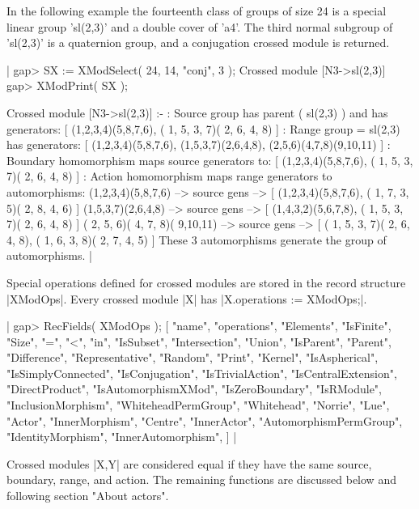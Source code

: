 In the following example the fourteenth class of  groups of size 24 is
a  special linear  group 'sl(2,3)'  and a  double cover  of 'a4'.  The
third normal  subgroup   of 'sl(2,3)' is a    quaternion group, and  a
conjugation crossed module is returned.

|    gap> SX := XModSelect( 24, 14, "conj", 3 );
    Crossed module [N3->sl(2,3)] 
    gap> XModPrint( SX );

    Crossed module [N3->sl(2,3)] :- 
    : Source group has parent ( sl(2,3) )  and has generators:
      [ (1,2,3,4)(5,8,7,6), ( 1, 5, 3, 7)( 2, 6, 4, 8) ]
    : Range group = sl(2,3)  has generators:
      [ (1,2,3,4)(5,8,7,6), (1,5,3,7)(2,6,4,8), (2,5,6)(4,7,8)(9,10,11) ]
    : Boundary homomorphism maps source generators to:
      [ (1,2,3,4)(5,8,7,6), ( 1, 5, 3, 7)( 2, 6, 4, 8) ]
    : Action homomorphism maps range generators to automorphisms:
      (1,2,3,4)(5,8,7,6) --> { source gens --> 
    [ (1,2,3,4)(5,8,7,6), ( 1, 7, 3, 5)( 2, 8, 4, 6) ] }
      (1,5,3,7)(2,6,4,8) --> { source gens -->  
    [ (1,4,3,2)(5,6,7,8), ( 1, 5, 3, 7)( 2, 6, 4, 8) ] }
      ( 2, 5, 6)( 4, 7, 8)( 9,10,11) --> { source gens --> 
    [ ( 1, 5, 3, 7)( 2, 6, 4, 8), ( 1, 6, 3, 8)( 2, 7, 4, 5) ] }
      These 3 automorphisms generate the group of automorphisms. |

%

Special  operations  defined for crossed    modules are stored  in the
record   structure    |XModOps|.  Every    crossed   module  |X|   has
|X.operations := XModOps;|.

|    gap> RecFields( XModOps );
    [ "name", "operations", "Elements", "IsFinite", "Size", "=", "<", 
      "in", "IsSubset", "Intersection", "Union", "IsParent", "Parent", 
      "Difference", "Representative", "Random", "Print", "Kernel", 
      "IsAspherical", "IsSimplyConnected", "IsConjugation", 
      "IsTrivialAction", "IsCentralExtension", "DirectProduct", 
      "IsAutomorphismXMod", "IsZeroBoundary", "IsRModule",
      "InclusionMorphism", "WhiteheadPermGroup", "Whitehead", "Norrie",
      "Lue", "Actor", "InnerMorphism", "Centre", "InnerActor",
       "AutomorphismPermGroup", "IdentityMorphism", "InnerAutomorphism", ] |

Crossed  modules |X,Y|  are  considered equal if   they have  the same
source, boundary,  range, and  action.   The remaining  functions  are
discussed below and following section "About actors".

